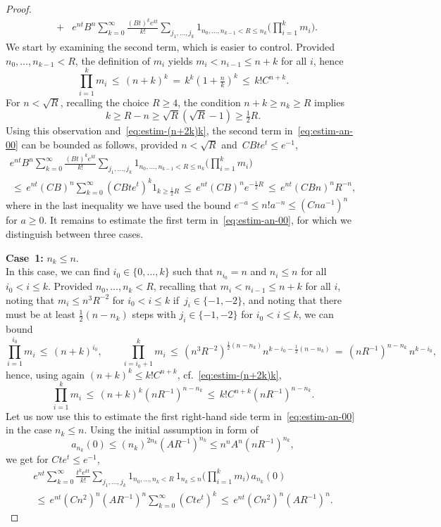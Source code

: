 \documentclass[a4paper,11pt,reqno,noindent]{amsart}
\theoremstyle{plain}
\theoremstyle{definition}
\numberwithin{equation}{section}
\begin{document}
\begin{proof}
\begin{eqnarray}
&+&e^{nt}B^n\sum_{k=0}^\infty \tfrac{(Bt)^ke^{kt}}{k!}\sum_{j_1,\ldots,j_k}1_{n_0,\ldots,n_{k-1}<R\le n_k}\Big(\prod_{i=1}^km_i\Big).\label{eq:estim-an-00}
\end{eqnarray}
We start by examining the second term, which is easier to control. Provided $n_0,\ldots,n_{k-1}<R$, the definition of $m_i$ yields $m_i< n_{i-1}\le n+k$ for all $i$, hence 
\begin{equation}\label{eq:estim-(n+2k)k}
\prod_{i=1}^km_i\,\le\,(n+k)^k\,=\,k^k(1+\tfrac{n}{k})^k\,\le\,k!C^{n+k}.
\end{equation}
For $n<\sqrt R$, recalling the choice $R\ge4$, the condition $n+k\ge n_k\ge R$ implies
\[k\ge R-n\ge \sqrt R(\sqrt R-1)\ge\tfrac12R.\]
Using this observation and~\eqref{eq:estim-(n+2k)k}, the second term in~\eqref{eq:estim-an-00} can be bounded as follows, provided $n<\sqrt R$ and~$CBte^{t}\le e^{-1}$,
\begin{multline}\label{eq:red-an-hier}
e^{nt}B^n\sum_{k=0}^\infty \tfrac{(Bt)^ke^{kt}}{k!}\sum_{j_1,\ldots,j_k}1_{n_0,\ldots,n_{k-1}<R\le n_k}\Big(\prod_{i=1}^km_i\Big)\\
\,\le\,e^{nt}(CB)^n\sum_{k=0}^\infty (CBte^t)^k1_{k\ge\frac12R}
\,\le\,e^{nt}(CB)^ne^{-\frac12R}\,\le\,e^{nt}(CBn)^nR^{-n},
\end{multline}
where in the last inequality we have used the bound $e^{-a}\le n!a^{-n}\le (Cna^{-1})^n$ for $a\ge0$.
It remains to estimate the first term in~\eqref{eq:estim-an-00}, for which we distinguish between three cases.

\medskip\noindent
{\bf Case~1:} $n_k\le n$.\\
In this case, we can find $i_0\in\{0,\ldots,k\}$ such that $n_{i_0}=n$ and $n_i\le n$ for all $i_0<i\le k$. Provided $n_0,\ldots,n_k<R$, recalling that $m_i< n_{i-1}\le n+k$ for all $i$, noting that $m_i\le n^3R^{-2}$ for $i_0<i\le k$ if~$j_i\in\{-1,-2\}$, and noting that there must be at least $\frac12(n-n_k)$ steps with $j_i\in\{-1,-2\}$ for $i_0<i\le k$, we can bound
\[\prod_{i=1}^{i_0}m_i\,\le\,(n+k)^{i_0},\qquad\prod_{i=i_0+1}^{k}m_i\,\le\,(n^3R^{-2})^{\frac12(n-n_k)}n^{k-i_0-\frac12(n-n_k)}\,=\,(nR^{-1})^{n-n_k}\,n^{k-i_0},\]
hence, using again $(n+k)^k\le k!C^{n+k}$, cf.~\eqref{eq:estim-(n+2k)k},
\[\prod_{i=1}^{k}m_i\,\le\,(n+k)^{k}(nR^{-1})^{n-n_k}\,\le\,k!C^{n+k}(nR^{-1})^{n-n_k}.\]
Let us now use this to estimate the first right-hand side term in~\eqref{eq:estim-an-00} in the case $n_k\le n$. Using the initial assumption in form of
\[a_{n_k}(0)\le (n_k)^{2n_k}(AR^{-1})^{n_k}\le n^nA^n(nR^{-1})^{n_k},\]
we get for $Cte^{t}\le e^{-1}$,
\begin{multline*}
e^{nt}\sum_{k=0}^\infty \tfrac{t^ke^{kt}}{k!}\sum_{j_1,\ldots,j_k}1_{n_0,\ldots,n_k<R}\,1_{n_k\le n}\Big(\prod_{i=1}^km_i\Big)\,a_{n_k}(0)\\[-2mm]
\,\le\,e^{nt}(Cn^2)^n(AR^{-1})^{n}\sum_{k=0}^\infty (Cte^{t})^k
\,\le\,e^{nt}(Cn^2)^n(AR^{-1})^{n}.
\end{multline*}


\end{proof}
\end{document}
